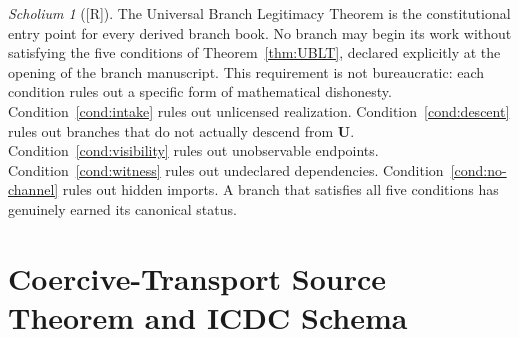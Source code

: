 \documentclass[12pt,oneside]{amsbook}
\theoremstyle{plain}
\theoremstyle{definition}
\theoremstyle{remark}
\newtheorem{scholium}[theorem]{Scholium}
\newcommand{\status}[1]{\textup{[#1]}}
\begin{document}
\medskip

\begin{scholium}[\status{R}]\label{sch:V-discipline}
The Universal Branch Legitimacy Theorem is the constitutional entry
point for every derived branch book.  No branch may begin its work
without satisfying the five conditions of Theorem~\ref{thm:UBLT},
declared explicitly at the opening of the branch manuscript.  This
requirement is not bureaucratic: each condition rules out a specific
form of mathematical dishonesty.  Condition~\ref{cond:intake} rules
out unlicensed realization.  Condition~\ref{cond:descent} rules out
branches that do not actually descend from $\mathbf{U}$.
Condition~\ref{cond:visibility} rules out unobservable endpoints.
Condition~\ref{cond:witness} rules out undeclared dependencies.
Condition~\ref{cond:no-channel} rules out hidden imports.  A branch
that satisfies all five conditions has genuinely earned its canonical
status.
\end{scholium}


\section{Coercive-Transport Source Theorem and ICDC Schema}
\label{sec:br-source}
\end{document}
